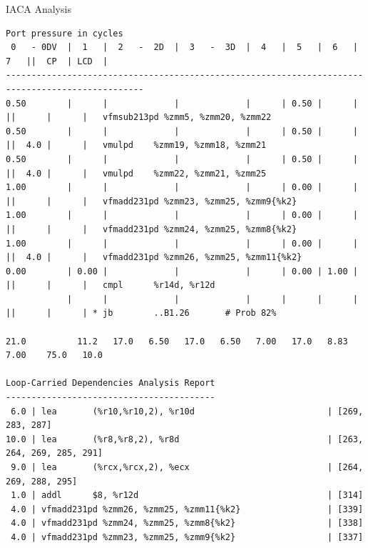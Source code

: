 \documentclass[aspectratio=169,t]{beamer}
\begin{document}
  \begin{frame}[fragile]{IACA Analysis}
    \vspace{-20pt}
    \begin{lstlisting}[basicstyle=\tt\fontsize{4pt}{6pt}\selectfont]
                                     Port pressure in cycles
 0   - 0DV  |  1   |  2   -  2D  |  3   -  3D  |  4   |  5   |  6   |  7   ||  CP  | LCD  |
-------------------------------------------------------------------------------------------------
0.50        |      |             |             |      | 0.50 |      |      ||      |      |   vfmsub213pd %zmm5, %zmm20, %zmm22
0.50        |      |             |             |      | 0.50 |      |      ||  4.0 |      |   vmulpd    %zmm19, %zmm18, %zmm21
0.50        |      |             |             |      | 0.50 |      |      ||  4.0 |      |   vmulpd    %zmm22, %zmm21, %zmm25
1.00        |      |             |             |      | 0.00 |      |      ||      |      |   vfmadd231pd %zmm23, %zmm25, %zmm9{%k2}
1.00        |      |             |             |      | 0.00 |      |      ||      |      |   vfmadd231pd %zmm24, %zmm25, %zmm8{%k2}
1.00        |      |             |             |      | 0.00 |      |      ||  4.0 |      |   vfmadd231pd %zmm26, %zmm25, %zmm11{%k2}
0.00        | 0.00 |             |             |      | 0.00 | 1.00 |      ||      |      |   cmpl      %r14d, %r12d
            |      |             |             |      |      |      |      ||      |      | * jb        ..B1.26       # Prob 82%

21.0          11.2   17.0   6.50   17.0   6.50   7.00   17.0   8.83   7.00    75.0   10.0

Loop-Carried Dependencies Analysis Report
-----------------------------------------
 6.0 | lea       (%r10,%r10,2), %r10d                          | [269, 283, 287]
10.0 | lea       (%r8,%r8,2), %r8d                             | [263, 264, 269, 285, 291]
 9.0 | lea       (%rcx,%rcx,2), %ecx                           | [264, 269, 288, 295]
 1.0 | addl      $8, %r12d                                     | [314]
 4.0 | vfmadd231pd %zmm26, %zmm25, %zmm11{%k2}                 | [339]
 4.0 | vfmadd231pd %zmm24, %zmm25, %zmm8{%k2}                  | [338]
 4.0 | vfmadd231pd %zmm23, %zmm25, %zmm9{%k2}                  | [337]
    \end{lstlisting}
  \end{frame}
\end{document}
